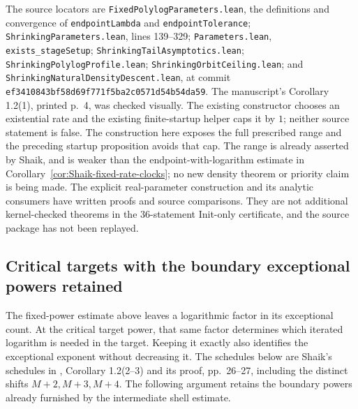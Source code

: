 The source locators are \texttt{FixedPolylogParameters.lean}, the
definitions and convergence of \texttt{endpointLambda} and
\texttt{endpointTolerance};
\texttt{ShrinkingParameters.lean}, lines 139--329;
\texttt{Parameters.lean}, \texttt{exists\_stageSetup};
\texttt{ShrinkingTailAsymptotics.lean};
\texttt{ShrinkingPolylogProfile.lean};
\texttt{ShrinkingOrbitCeiling.lean}; and
\texttt{ShrinkingNaturalDensityDescent.lean}, at commit
\texttt{ef3410843bf58d69f771f5ba2c0571d54b54da59}.
The manuscript's Corollary 1.2(1), printed p.~4, was checked visually.
The existing constructor chooses an existential rate and the existing
finite-startup helper caps it by \(1\); neither source statement is
false. The construction here exposes the full prescribed range and the
preceding startup proposition avoids that cap.
The range is already asserted by Shaik, and is weaker than the
endpoint-with-logarithm estimate in
Corollary~\ref{cor:Shaik-fixed-rate-clocks}; no new density theorem
or priority claim is being made. The explicit real-parameter construction
and its analytic consumers have written proofs and source comparisons.
They are not additional kernel-checked theorems in the 36-statement
Init-only certificate, and the source package has not been replayed.

\subsection{Critical targets with the boundary exceptional powers retained}
\label{subsec:Shaik-critical-scales}
The fixed-power estimate above leaves a logarithmic factor in its exceptional
count. At the critical target power, that same factor determines which
iterated logarithm is needed in the target. Keeping it exactly also identifies
the exceptional exponent without decreasing it. The schedules below are
Shaik's schedules in \cite{Shaik2026v324}, Corollary 1.2(2--3) and its proof,
pp.~26--27, including the distinct shifts \(M+2,M+3,M+4\).
The following argument retains the boundary powers already furnished by
the intermediate shell estimate.

